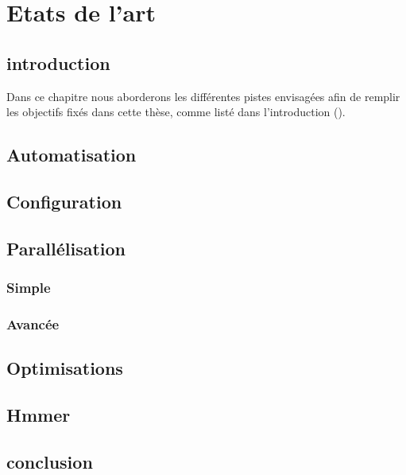 \chapter{Etats de l'art}
\label{ch:state_art}

\section{introduction}
Dans ce chapitre nous aborderons les différentes pistes envisagées afin de remplir les objectifs fixés dans cette thèse, comme listé dans l'introduction ().


\section{Automatisation}

\section{Configuration}


\section{Parallélisation}
	

\subsection{Simple}
\subsection{Avancée}

\section{Optimisations}

\section{Hmmer}

\section{conclusion}
